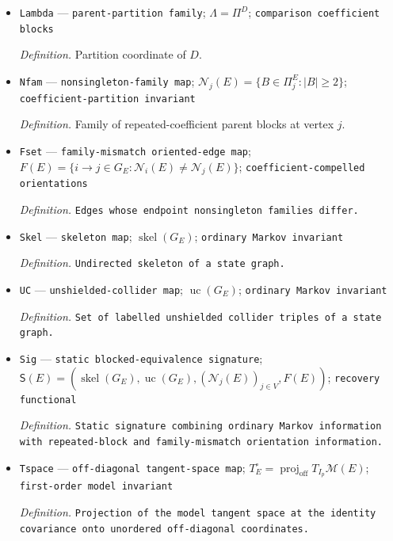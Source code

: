\documentclass{article}
\begin{document}
\begin{itemize}
  \item \texttt{Lambda} --- \texttt{parent-\allowbreak{}partition family}; \(\Lambda=\Pi^D\); \texttt{comparison coefficient blocks}
  \par\smallskip\noindent\emph{Definition.} Partition coordinate of \(D\).
  \item \texttt{Nfam} --- \texttt{nonsingleton-\allowbreak{}family map}; \(\mathcal N_j(E)=\{B\in\Pi^E_j:|B|\geq2\}\); \texttt{coefficient-\allowbreak{}partition invariant}
  \par\smallskip\noindent\emph{Definition.} Family of repeated-coefficient parent blocks at vertex \(j\).
  \item \texttt{Fset} --- \texttt{family-\allowbreak{}mismatch oriented-\allowbreak{}edge map}; \(F(E)=\{i\to j\in G_E:\mathcal N_i(E)\neq\mathcal N_j(E)\}\); \texttt{coefficient-\allowbreak{}compelled orientations}
  \par\smallskip\noindent\emph{Definition.} \texttt{Edges whose endpoint nonsingleton families differ.}
  \item \texttt{Skel} --- \texttt{skeleton map}; \(\operatorname{skel}(G_E)\); \texttt{ordinary Markov invariant}
  \par\smallskip\noindent\emph{Definition.} \texttt{Undirected skeleton of a state graph.}
  \item \texttt{UC} --- \texttt{unshielded-\allowbreak{}collider map}; \(\operatorname{uc}(G_E)\); \texttt{ordinary Markov invariant}
  \par\smallskip\noindent\emph{Definition.} \texttt{Set of labelled unshielded collider triples of a state graph.}
  \item \texttt{Sig} --- \texttt{static blocked-\allowbreak{}equivalence signature}; \(\mathsf S(E)=(\operatorname{skel}(G_E),\operatorname{uc}(G_E),(\mathcal N_j(E))_{j\in V},F(E))\); \texttt{recovery functional}
  \par\smallskip\noindent\emph{Definition.} \texttt{Static signature combining ordinary Markov information with repeated-\allowbreak{}block and family-\allowbreak{}mismatch orientation information.}
  \item \texttt{Tspace} --- \texttt{off-\allowbreak{}diagonal tangent-\allowbreak{}space map}; \(T_E^{\circ}=\operatorname{proj}_{\mathrm{off}}T_{I_p}\mathcal M(E)\); \texttt{first-\allowbreak{}order model invariant}
  \par\smallskip\noindent\emph{Definition.} \texttt{Projection of the model tangent space at the identity covariance onto unordered off-\allowbreak{}diagonal coordinates.}

\end{itemize}
\end{document}
